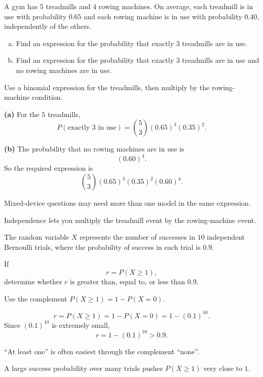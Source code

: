 \begin{problem}
A gym has $5$ treadmills and $4$ rowing machines. On average, each treadmill is in use with probability $0.65$ and each rowing machine is in use with probability $0.40$, independently of the others.
\begin{enumerate}[(a)]
  \item Find an expression for the probability that exactly $3$ treadmills are in use.
  \item Find an expression for the probability that exactly $3$ treadmills are in use and no rowing machines are in use.
\end{enumerate}
\end{problem}

\begin{hint}
Use a binomial expression for the treadmills, then multiply by the rowing-machine condition.
\end{hint}

\begin{solution}
\textbf{(a)} For the $5$ treadmills,
\[
P(\text{exactly 3 in use})=\binom53(0.65)^3(0.35)^2.
\]

\textbf{(b)} The probability that no rowing machines are in use is
\[
(0.60)^4.
\]
So the required expression is
\[
\binom53(0.65)^3(0.35)^2(0.60)^4.
\]
\end{solution}

\begin{takeaways}
\item Mixed-device questions may need more than one model in the same expression.
\item Independence lets you multiply the treadmill event by the rowing-machine event.
\end{takeaways}

\begin{problem}
The random variable $X$ represents the number of successes in $10$ independent Bernoulli trials, where the probability of success in each trial is $0.9$.

If
\[
r=P(X\ge 1),
\]
determine whether $r$ is greater than, equal to, or less than $0.9$.
\end{problem}

\begin{hint}
Use the complement $P(X\ge 1)=1-P(X=0)$.
\end{hint}

\begin{solution}
\[
r=P(X\ge 1)=1-P(X=0)=1-(0.1)^{10}.
\]
Since $(0.1)^{10}$ is extremely small,
\[
r=1-(0.1)^{10}>0.9.
\]
\end{solution}

\begin{takeaways}
\item ``At least one'' is often easiest through the complement ``none''.
\item A large success probability over many trials pushes $P(X\ge 1)$ very close to $1$.
\end{takeaways}
